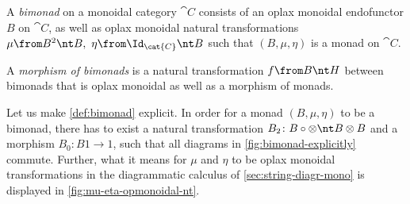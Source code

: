 \begin{definition}\label{def:bimonad}
  A \emph{bimonad} on a monoidal category \(\cat{C}\) consists of
  an oplax monoidal endofunctor \(B\) on \(\cat{C}\), as well as
  oplax monoidal natural transformations \(\mu \from B^2 \nt B,\ \eta\from \Id_{\cat{C}} \nt B\)
  such that \((B, \mu, \eta)\) is a monad on \(\cat{C}\).

  A \emph{morphism of bimonads} is
  a natural transformation \(f\from B \nt H\) between bimonads
  that is oplax monoidal as well as a morphism of monads.
\end{definition}

Let us make \cref{def:bimonad} explicit.
In order for a monad \((B, \mu, \eta)\) to be a bimonad, there has to exist
a natural transformation \(B_2 \colon B \circ \otimes \nt B \otimes B\)
and a morphism \(B_0 \colon B1 \to 1\), such that all diagrams in \cref{fig:bimonad-explicitly} commute.
Further,
what it means for \(\mu\) and \(\eta\) to be oplax monoidal transformations
in the diagrammatic calculus of \cref{sec:string-diagr-mono}
is displayed in \cref{fig:mu-eta-opmonoidal-nt}.

